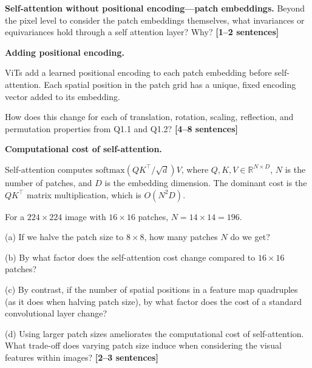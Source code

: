 \documentclass{csci1430}
\begin{document}
\pagebreak
\begin{subquestion}[points=2]
\textbf{Self-attention without positional encoding---patch embeddings.}
Beyond the pixel level to consider the patch embeddings themselves, what invariances or equivariances hold through a self attention layer? Why? \textbf{[1--2 sentences]}
\end{subquestion}

\begin{answer}[height=14]

\end{answer}

\pagebreak
\begin{subquestion}[points=4]
\textbf{Adding positional encoding.}

ViTs add a learned positional encoding to each patch embedding before self-attention. Each spatial position in the patch grid has a unique, fixed encoding vector added to its embedding.

How does this change for each of translation, rotation, scaling, reflection, and permutation properties from Q1.1 and Q1.2? \textbf{[4--8 sentences]}
\end{subquestion}

\begin{answer}[height=28]

\end{answer}


\pagebreak
\begin{subquestion}[points=4]
\textbf{Computational cost of self-attention.}

Self-attention computes $\text{softmax}(QK^\top / \sqrt{d})V$, where $Q, K, V \in \mathbb{R}^{N \times D}$, $N$ is the number of patches, and $D$ is the embedding dimension. The dominant cost is the $QK^\top$ matrix multiplication, which is $O(N^2 D)$.

For a $224 \times 224$ image with $16 \times 16$ patches, $N = 14 \times 14 = 196$.

\vspace{0.5em}
\noindent (a) If we halve the patch size to $8 \times 8$, how many patches $N$ do we get?

\vspace{0.5em}
\noindent (b) By what factor does the self-attention cost change compared to $16 \times 16$ patches?

\vspace{0.5em}
\noindent (c) By contrast, if the number of spatial positions in a feature map quadruples (as it does when halving patch size), by what factor does the cost of a standard convolutional layer change?

\vspace{0.5em}
\noindent (d) Using larger patch sizes ameliorates the computational cost of self-attention. What trade-off does varying patch size induce when considering the visual features within images? \textbf{[2--3 sentences]}
\end{subquestion}
\end{document}
